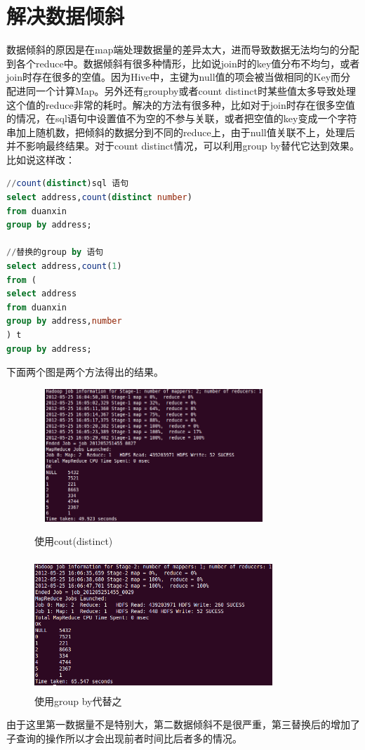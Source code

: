 \section{解决数据倾斜}
数据倾斜的原因是在map端处理数据量的差异太大，进而导致数据无法均匀的分配到各个reduce中。数据倾斜有很多种情形，比如说join时的key值分布不均匀，或者join时存在很多的空值。因为Hive中，主键为null值的项会被当做相同的Key而分配进同一个计算Map。另外还有groupby或者count distinct时某些值太多导致处理这个值的reduce非常的耗时。解决的方法有很多种，比如对于join时存在很多空值的情况，在sql语句中设置值不为空的不参与关联，或者把空值的key变成一个字符串加上随机数，把倾斜的数据分到不同的reduce上，由于null值关联不上，处理后并不影响最终结果。对于count distinct情况，可以利用group by替代它达到效果。比如说这样改：
\begin{lstlisting}[language=SQL]
//count(distinct)sql 语句
select address,count(distinct number)
from duanxin
group by address;

//替换的group by 语句
select address,count(1)
from (
select address
from duanxin
group by address,number
) t
group by address;
\end{lstlisting}

下面两个图是两个方法得出的结果。
\begin{figure}[h]
\begin{minipage}[t]{0.45\linewidth}
\centering
\includegraphics[width=0.8\textwidth,height=5cm]{photo/qxbefore.png}
\caption{使用cout(distinct)}
\end{minipage}
\hfill
\begin{minipage}[t]{0.45\linewidth}
\centering
\includegraphics[width=0.8\textwidth,height=5cm]{photo/qxafter.png}
\caption{使用group by代替之}
\end{minipage}
\end{figure}
由于这里第一数据量不是特别大，第二数据倾斜不是很严重，第三替换后的增加了子查询的操作所以才会出现前者时间比后者多的情况。


